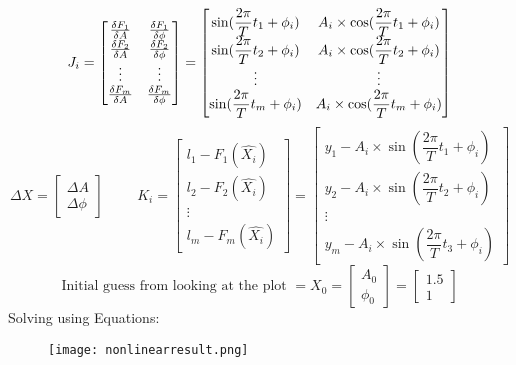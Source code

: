 \[
J_i = \begin{bmatrix}
	\frac{\delta F_1}{\delta A} &  \frac{\delta F_1}{\delta \phi} \\
	\frac{\delta F_2}{\delta A} & \frac{\delta F_2}{\delta \phi} \\
	\vdots & \vdots \\
	\frac{\delta F_m}{\delta A} & \frac{\delta F_m}{\delta \phi} \\
\end{bmatrix}
=
\begin{bmatrix}
\sin(\dfrac{2\pi}{T}t_1 + \phi_i) & A_i \times \cos(\dfrac{2\pi}{T}t_1 + \phi_i) \\
\sin(\dfrac{2\pi}{T}t_2 + \phi_i) & A_i \times \cos(\dfrac{2\pi}{T}t_2 + \phi_i) \\
\vdots & \vdots \\
\sin(\dfrac{2\pi}{T}t_m + \phi_i) & A_i \times \cos(\dfrac{2\pi}{T}t_m + \phi_i) \\
\end{bmatrix}
\]
\[
\Delta X = 
\begin{bmatrix}
\Delta A \\ \Delta \phi
\end{bmatrix}
\hspace{1cm}
K_i = 
\begin{bmatrix}
l_1 - F_1(\hat{X_i}) \\ l_2 - F_2(\hat{X_i})\\ \vdots \\ l_m - F_m(\hat{X_i})
\end{bmatrix}
=
\begin{bmatrix}
y_1 - A_i \times \sin(\dfrac{2\pi}{T}t_1 + \phi_i) \\
y_2 - A_i \times \sin(\dfrac{2\pi}{T}t_2 + \phi_i) \\
\vdots \\
y_m - A_i \times \sin(\dfrac{2\pi}{T}t_3 + \phi_i)
\end{bmatrix}
\]
\[
\text{Initial guess from looking at the plot } = X_0 = 
\begin{bmatrix}
A_0 \\ \phi_0
\end{bmatrix}
=
\begin{bmatrix}
1.5 \\ 1
\end{bmatrix}
\]
\clearpage
Solving using Equations:





\begin{figure}[H]
	\centering
	\texttt{[image: nonlinearresult.png]}
\end{figure}

